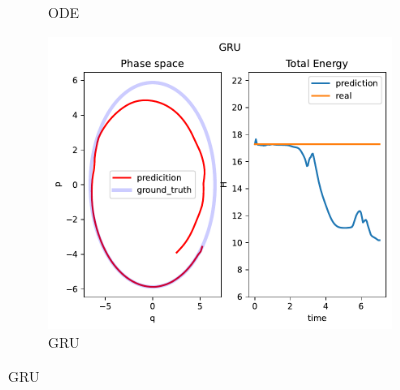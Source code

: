 \begin{figure}[H]
\begin{subfigure}[b]{0.3\textwidth}
		\caption{ODE}
	\end{subfigure}
	\hfill
	\begin{subfigure}[b]{0.3\textwidth}
		\centering
		\includegraphics[width=\textwidth]{chapters/chapter5/osci_gru_ps.pdf}
		\caption{GRU}
	\end{subfigure}
	
	\vspace{0.5cm} %
	

\end{figure}
